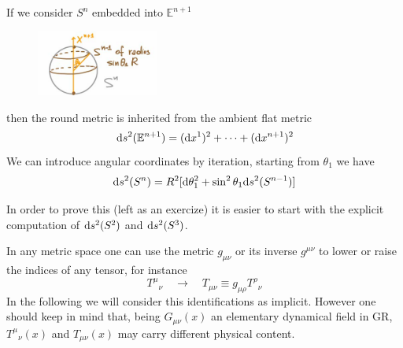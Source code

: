 \documentclass[../main/main.tex]{subfiles}
\begin{document}
\begin{example}
If we consider $S^n$ embedded into $\mathbb E^{n+1}$ 
\begin{figure}[H]
\centering
\includegraphics[width=4cm]{../img/round-metric-sn.jpg}
\end{figure}
then the round metric is inherited from the ambient flat metric
\[\textup{d} s^2(\mathbb E^{n+1})=(\textup{d} x^1)^2+\dots+(\textup{d} x^{n+1})^2\]
We can introduce angular coordinates by iteration, starting from $\theta_1$ we have
\[\textup{d} s^2(S^n)=R^2[\textup{d}\theta_1^2+\sin^2\theta_1\textup{d} s^2(S^{n-1})]\]

In order to prove this (left as an exercize) it is easier to start with the explicit computation of $\textup{d} s^2(S^2)$ and $\textup{d} s^2(S^3)$. 

\end{example}


In any metric space one can use the metric $g_{\mu\nu}$ or its inverse $g^{\mu\nu}$ to lower or raise the indices of any tensor, for instance
\[{T^\mu}_\nu\quad\longrightarrow\quad T_{\mu\nu}\equiv g_{\mu\rho}{T^\rho}_\nu\]
In the following we will consider this identifications as implicit. However one should keep in mind that, being $G_{\mu\nu}(x)$ an elementary dynamical field in GR, ${T^\mu}_\nu(x)$ and $T_{\mu\nu}(x)$ may carry different physical content.
\end{document}
